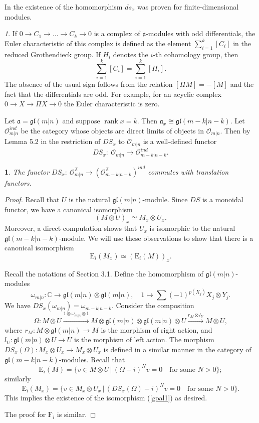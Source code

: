 \documentclass[12pt,oneside,english]{amsart}
\numberwithin{equation}{section}
\numberwithin{figure}{section}
\theoremstyle{plain}
\theoremstyle{plain}
\newtheorem{lem}[thm]{\protect\lemmaname}
\theoremstyle{remark}
\newtheorem{rem}[thm]{\protect\remarkname}
\theoremstyle{definition}
\theoremstyle{plain}
\theoremstyle{remark}
\theoremstyle{definition}
\theoremstyle{plain}
\theoremstyle{plain}
\theoremstyle{definition}
\providecommand{\lemmaname}{Lemma}
\providecommand{\remarkname}{Remark}
\newcommand{\fa}{\mathfrak{a}}
\begin{document}
In \cite{HR} the existence of the homomorphism $ds_x$ was proven for finite-dimensional modules.
\begin{rem} If $0\to C_1\to\dots\to C_k\to 0$ is a complex of $\fa$-modules with odd differentials, the Euler characteristic of this complex is defined as the element  $\sum_{i=1}^k [C_i]$ in the reduced Grothendieck group. If $H_i$ denotes the $i$-th cohomology group, then
  $$\sum_{i=1}^k[C_i]=\sum_{i=1}^k[H_i].$$
  The absence of the usual sign follows from the relation $[\Pi M]=-[M]$ and the fact that the differentials are odd. For example, for an acyclic complex
  $0\to X\to\Pi X\to 0$ the Euler characteristic is zero.
  \end{rem}
Let $\fa=\mathfrak{gl}(m|n)$ and suppose $\operatorname{rank}x=k$.  Then $\fa_x\cong \mathfrak{gl}(m-k|n-k)$.
Let  $\mathcal{O}^{ind}_{m|n}$ be the category whose objects are direct limits of objects in $\mathcal{O}_{m|n}$. Then by Lemma 5.2 in \cite{CS} the restriction
of $DS_x$ to $\mathcal{O}_{m|n}$ is a well-defined functor
$$DS_{x}:\ \mathcal{O}_{m|n} \rightarrow\mathcal{O}^{ind}_{m-k|n-k}.$$



\begin{lem}\label{lem:commute} The functor $DS_{x}:\ \mathcal{O}^{\mathbb Z}_{m|n} \rightarrow(\mathcal{O}^{\mathbb Z}_{m-k|n-k})^{ind}$ commutes with translation functors.
\end{lem}
\begin{proof} Recall that $U$ is the natural  $\mathfrak{gl}\left(m|n\right)$-module. Since $DS$ is a monoidal functor, we have a canonical isomorphism
  $$(M\otimes U)_x\simeq M_x\otimes U_x.$$
  Moreover, a direct computation shows that $U_x$ is isomorphic to the natural $\mathfrak{gl}(m-k|n-k)$-module. We will use these observations to show that there is
  a canonical isomorphism
  \begin{equation}\label{goal1}
   \mathrm{E}_i(M_x)\simeq (\mathrm{E}_i(M))_x.
\end{equation}

   Recall the notations of Section 3.1. Define the homomorphism of $\mathfrak{gl}(m|n)$-modules
  $$\omega_{m|n}:\mathbb C\to\mathfrak{gl}(m|n)\otimes \mathfrak{gl}(m|n), \quad 1\mapsto\sum (-1)^{p(X_j)}X_j\otimes Y_j.$$
  We have $DS_x(\omega_{m|n})=\omega_{m-k|n-k}$. Consider the composition
  $$\Omega: M\otimes U\xrightarrow{1\otimes \omega_{m|n}\otimes 1}M\otimes \mathfrak{gl}(m|n)\otimes \mathfrak{gl}(m|n)\otimes U
  \xrightarrow{r_M\otimes l_U}M\otimes U,
  $$
  where $r_M :M\otimes \mathfrak{gl}(m|n)\to M$ is the morphism of right action, and  $l_U:\mathfrak{gl}(m|n)\otimes U\to U$ is the morphism of left action.
  The morphism $DS_x(\Omega):M_x\otimes U_x\to M_x\otimes U_x$ is defined in a similar manner in the category of $\mathfrak{gl}(m-k|n-k)$-modules.
  Recall that
  $$\mathrm{E}_i(M)=\{v\in M\otimes U\,|\,(\Omega-i)^Nv=0\quad\text{for some}\,\,N>0\};$$
  similarly
  $$\mathrm{E_i}(M_x)=\{v\in M_x\otimes U_x\,|\,(DS_x(\Omega)-i)^Nv=0\quad\text{for some}\,\,N>0\}.$$
  This implies the existence of the isomorphism (\ref{goal1}) as desired.

  The proof for $\mathrm{F}_i$ is similar.
  \end{proof}
\end{document}
